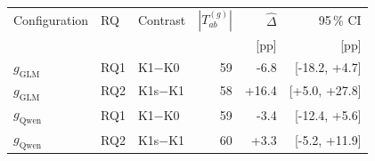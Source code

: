 \begin{tabular}{@{}lllrrr@{}}
  \toprule
  Configuration & RQ & Contrast & $|T^{(g)}_{ab}|$ & $\widehat\Delta$ & 95\,\% CI \\
   & & & & [pp] & [pp] \\
  \midrule
  $g_{\mathrm{GLM}}$ & RQ1 & K1$-$K0 & 59 & -6.8 & [-18.2, +4.7] \\
  \rowcolor{black!6} $g_{\mathrm{GLM}}$ & RQ2 & K1s$-$K1 & 58 & +16.4 & [+5.0, +27.8] \\
  $g_{\mathrm{Qwen}}$ & RQ1 & K1$-$K0 & 59 & -3.4 & [-12.4, +5.6] \\
  \rowcolor{black!6} $g_{\mathrm{Qwen}}$ & RQ2 & K1s$-$K1 & 60 & +3.3 & [-5.2, +11.9] \\
  \bottomrule
\end{tabular}
